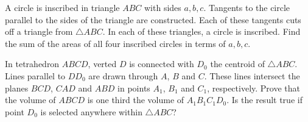
\begin{exercise}[3/1964]
    A circle is inscribed in triangle $ABC$ with sides $a, b, c$.
    Tangents to the circle parallel to the sides of the triangle are constructed.
    Each of these tangents cuts off a triangle from $\triangle ABC$.
    In each of these triangles, a circle is inscribed.
    Find the sum of the areas of all four inscribed circles in terms of $a, b, c$.
\end{exercise}

\begin{exercise}[6/1964]
    In tetrahedron $ABCD$, verted $D$ is connected with $D_0$ the centroid of $\triangle ABC$.
    Lines parallel to $DD_0$ are drawn through $A$, $B$ and $C$.
    These lines intersect the planes $BCD$, $CAD$ and $ABD$ in points $A_1$, $B_1$ and $C_1$, respectively.
    Prove that the volume of $ABCD$ is one third the volume of $A_1 B_1 C_1 D_0$.
    Is the result true if point $D_0$ is selected anywhere within $\triangle ABC$?
\end{exercise}